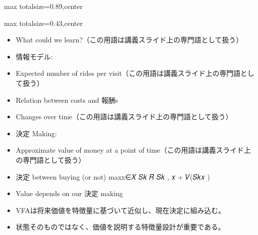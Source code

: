 \begin{minipage}[t]{0.58\textwidth}
\begin{adjustbox}{max totalsize={\textwidth}{0.89\textheight},center}
\begin{minipage}{\textwidth}
\end{minipage}
\end{adjustbox}
\end{minipage}


\clearpage
{}
\begin{minipage}[t]{0.405\textwidth}
\begin{adjustbox}{max totalsize={\textwidth}{0.43\textheight},center}
\begin{minipage}{\textwidth}\scriptsize
{}\begin{itemize}
\item What could we learn?（この用語は講義スライド上の専門語として扱う）
\item 情報モデル:
\item Expected number of rides per visit（この用語は講義スライド上の専門語として扱う）
\item Relation between costs and 報酬s
\item Changes over time（この用語は講義スライド上の専門語として扱う）
\item 決定 Making:
\item Approximate value of money at a point of time（この用語は講義スライド上の専門語として扱う）
\item 決定 between buying (or not) maxx∈𝑋 𝑆𝑘 𝑅 𝑆𝑘 , 𝑥 + 𝑉(𝑆𝑘𝑥 )
\item Value depends on our 決定 making
\end{itemize}\begin{itemize}
\item VFAは将来価値を特徴量に基づいて近似し、現在決定に組み込む。
\item 状態そのものではなく、価値を説明する特徴量設計が重要である。
\end{itemize}
\end{minipage}
\end{adjustbox}
\end{minipage}\hfill
